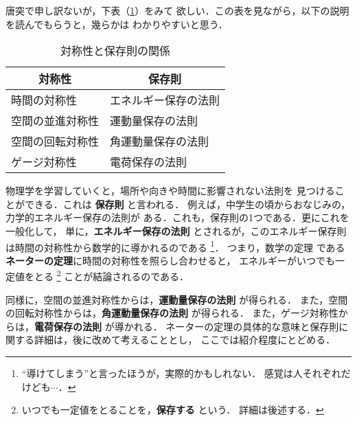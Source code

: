             唐突で申し訳ないが，下表（\ref{tab:Synmmetry_and_Conservation}）をみて
            欲しい．この表を見ながら，以下の説明を読んでもらうと，幾らかは
            わかりやすいと思う．
            \begin{table}[hbt]
                \label{tab:Synmmetry_and_Conservation}
                \caption{対称性と保存則の関係}
                \begin{center}
                    \begin{tabular}{l|l}
                        \multicolumn{1}{c|}{対称性} & \multicolumn{1}{c}{保存則} \\
                        \hline\hline
                        時間の対称性 & エネルギー保存の法則 \\
                        \hline
                        空間の並進対称性 & 運動量保存の法則 \\
                        \hline
                        空間の回転対称性 & 角運動量保存の法則 \\
                        \hline
                         ゲージ対称性 & 電荷保存の法則 \\
                    \end{tabular}
                \end{center}
            \end{table}

            物理学を学習していくと，場所や向きや時間に影響されない法則を
            見つけることができる．これは \textbf{保存則} と言われる．
            例えば，中学生の頃からおなじみの，力学的エネルギー保存の法則が
            ある．これも，保存則の1つである．更にこれを一般化して，
            単に，\textbf{エネルギー保存の法則} とされるが，このエネルギー保存則
            は時間の対称性から数学的に導かれるのである
                \footnote{
                    “導けてしまう”と言ったほうが，実際的かもしれない．
                    感覚は人それぞれだけども$\cdots$．
                }．
            つまり，数学の定理
            である \textbf{ネーターの定理}に時間の対称性を照らし合わせると，
            エネルギーがいつでも一定値をとる
                \footnote{
                    いつでも一定値をとることを，\textbf{保存する} という．
                    詳細は後述する．
                }
            ことが結論されるのである．

            同様に，空間の並進対称性からは，\textbf{運動量保存の法則} が得られる．
            また，空間の回転対称性からは，\textbf{角運動量保存の法則} が得られる．
            また，ゲージ対称性からは，\textbf{電荷保存の法則} が導かれる．
            ネーターの定理の具体的な意味と保存則に関する詳細は，後に改めて考えることとし，
            ここでは紹介程度にとどめる．
